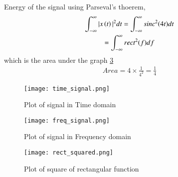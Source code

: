 \documentclass[journal,12pt,twocolumn]{IEEEtran}
\begin{document}
Energy of the signal using Parseval's thoerem,
\begin{multline}
    \int_{-\infty}^{\infty} |x\left(t\right)|^{2} dt = \int_{-\infty}^{\infty} sinc^2{\left(4t\right)}  dt \\= \int_{-\infty}^{\infty} rect^2{\left(f\right)}  df
\end{multline}
which is the area under the graph \ref{fig:rect_squared}
\begin{align}
    Area = 4 \times \frac{1}{4^2} = \frac{1}{4}
\end{align}
\begin{figure}[h!]
\centering
\texttt{[image: time\_signal.png]}
\caption{Plot of signal in Time domain}
\label{fig:sig_time}
\end{figure}
\begin{figure}[h!]
\centering
\texttt{[image: freq\_signal.png]}
\caption{Plot of signal in Frequency domain}
\label{fig:sig_freq}
\end{figure}
\begin{figure}[h!]
\centering
\texttt{[image: rect\_squared.png]}
\caption{Plot of square of rectangular function}
\label{fig:rect_squared}
\end{figure}
\end{document}
